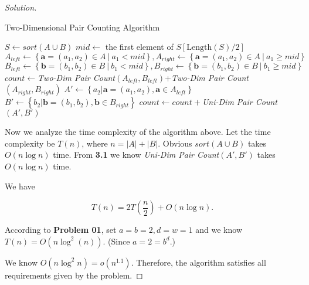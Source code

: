 \documentclass{article}
\newenvironment{solution}{\begin{proof}[\noindent\it Solution]}{\end{proof}}
\begin{document}
\begin{solution}
     \begin{algorithm}
        \caption{Two-Dimensional Pair Counting Algorithm}
        
	    {
	        \BlankLine
	        \BlankLine
	        \BlankLine
	        $S \gets sort\left(A\cup B\right)$\;
	        $mid \gets$ the first element of $S[\mathrm{Length}(S)/2]$\;
	        $A_{left}\gets\left\{\boldsymbol{a}=(a_1,a_2)\in A\ \big|\ a_1<mid\right\}, A_{right}\gets\left\{\boldsymbol{a}=(a_1,a_2)\in A\ \big|\ a_1\geq mid\right\}$\;
	        $B_{left}\gets\left\{\boldsymbol{b}=(b_1,b_2)\in B\ \big|\ b_1<mid\right\},
	        B_{right}\gets\left\{\boldsymbol{b}=(b_1,b_2)\in B\ \big|\ b_1\geq mid\right\}$\;
	        \BlankLine
	        \BlankLine
	        \BlankLine
	        $count\gets$\textit{Two-Dim Pair Count}$(A_{left},B_{left})$+\textit{Two-Dim Pair Count}$(A_{right},B_{right})$\;
	        $A'\gets\left\{a_2\big|\boldsymbol{a}=(a_1,a_2),\boldsymbol{a}\in A_{left}\right\}$\; $B'\gets\left\{b_2\big|\boldsymbol{b}=(b_1,b_2),\boldsymbol{b}\in B_{right}\right\}$\;
	        $count\gets count+$\textit{Uni-Dim Pair Count}$(A',B')$\;
	    }
    \end{algorithm}
    
    \hspace{2.5em}
    Now we analyze the time complexity of the algorithm above. Let the time complexity be $T(n)$, where $n=|A|+|B|$. Obvious $sort(A\cup B)$ takes $O(n\log n)$ time. From \textbf{3.1} we know \textit{Uni-Dim Pair Count}$(A',B')$ takes $O(n\log n)$ time.
    
    \hspace{2.5em}
    We have
    
    \vspace{-1.5em}
    $$T(n) = 2T\left(\frac{n}{2}\right)+O(n\log n).$$
    
    \hspace{2.5em}
    According to \textbf{Problem 01}, set $a=b=2, d=w=1$ and we know $T(n)=O\left(n\log^2(n)\right)$. (Since $a=2=b^d$.)
    
    \hspace{2.5em}
    We know $O(n\log^2n)=o(n^{1.1}).$ Therefore, the algorithm satisfies all requirements given by the problem.
\end{solution}
\end{document}
